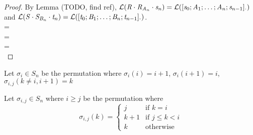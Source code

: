 \begin{lemma}
\begin{proof}
By Lemma (TODO, find ref),
$\mathcal{L}(\mathit{R}\cdot\mathit{R}_{\mathit{A}_n}\cdot\mathit{s}_n)=
\mathcal{L}([\mathit{s}_0 ; \mathit{A}_1 ; \ldots ;
\mathit{A}_n ; \mathit{s}_{n-1}]_{\cdot})$ and
$\mathcal{L}(\mathit{S}\cdot\mathit{S}_{\mathit{B}_n}\cdot\mathit{t}_n)=
\mathcal{L}([\mathit{t}_0 ; \mathit{B}_1 ; \ldots ;
\mathit{B}_n ; \mathit{t}_{n-1}]_{\cdot})$.\\
=\\
=\\
=\\
\end{proof}
\end{lemma}

\begin{definition}
Let $\sigma_{i} \in S_n$ be the permutation where
$\sigma_{i}(i) = i+1$, $\sigma_{i}(i+1) = i$, $\sigma_{i,j}(k\neq i,i+1) = k$
\end{definition}

\begin{definition}
Let $\sigma_{i,j} \in S_n$ where $i\geq j$ be the permutation where
\[
  \sigma_{i,j}(k)=
    \begin{cases}
      j& \text{if } k=i\\
      k+1& \text{if } j\leq k<i\\
      k& \text{otherwise}
    \end{cases}
\]
\end{definition}


